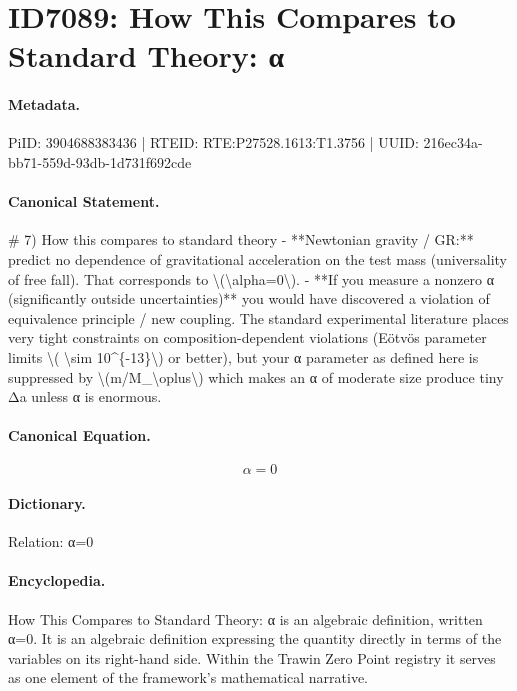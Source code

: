 \section*{ID7089: How This Compares to Standard Theory: α}
\paragraph{Metadata.}
PiID: 3904688383436 | RTEID: RTE:P27528.1613:T1.3756 | UUID: 216ec34a-bb71-559d-93db-1d731f692cde

\paragraph{Canonical Statement.}
\# 7) How this compares to standard theory - **Newtonian gravity / GR:** predict no dependence of gravitational acceleration on the test mass (universality of free fall). That corresponds to \textbackslash{}(\textbackslash{}alpha=0\textbackslash{}). - **If you measure a nonzero α (significantly outside uncertainties)** you would have discovered a violation of equivalence principle / new coupling. The standard experimental literature places very tight constraints on composition-dependent violations (Eötvös parameter limits \textbackslash{}( \textbackslash{}sim 10\textasciicircum{}\{-13\}\textbackslash{}) or better), but your α parameter as defined here is suppressed by \textbackslash{}(m/M\_\textbackslash{}oplus\textbackslash{}) which makes an α of moderate size produce tiny Δa unless α is enormous.

\paragraph{Canonical Equation.}
\[
\alpha=0
\]

\paragraph{Dictionary.}
Relation: α=0

\paragraph{Encyclopedia.}
How This Compares to Standard Theory: α is an algebraic definition, written α=0. It is an algebraic definition expressing the quantity directly in terms of the variables on its right-hand side. Within the Trawin Zero Point registry it serves as one element of the framework's mathematical narrative.
